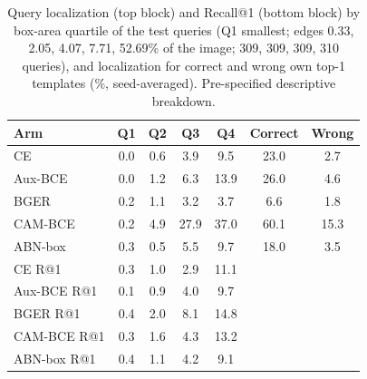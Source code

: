 \begin{table}[t]
\centering\footnotesize\setlength{\tabcolsep}{3pt}
\caption{Query localization (top block) and Recall@1 (bottom block) by box-area quartile of the test queries (Q1 smallest; edges 0.33, 2.05, 4.07, 7.71, 52.69\% of the image; 309, 309, 309, 310 queries), and localization for correct and wrong own top-1 templates (\%, seed-averaged). Pre-specified descriptive breakdown.}
\label{tab:osld-size}
\begin{tabular}{lcccccc}
\toprule
Arm & Q1 & Q2 & Q3 & Q4 & Correct & Wrong\\
\midrule
CE & 0.0 & 0.6 & 3.9 & 9.5 & 23.0 & 2.7\\
Aux-BCE & 0.0 & 1.2 & 6.3 & 13.9 & 26.0 & 4.6\\
BGER & 0.2 & 1.1 & 3.2 & 3.7 & 6.6 & 1.8\\
CAM-BCE & 0.2 & 4.9 & 27.9 & 37.0 & 60.1 & 15.3\\
ABN-box & 0.3 & 0.5 & 5.5 & 9.7 & 18.0 & 3.5\\
\midrule
CE R@1 & 0.3 & 1.0 & 2.9 & 11.1 & & \\
Aux-BCE R@1 & 0.1 & 0.9 & 4.0 & 9.7 & & \\
BGER R@1 & 0.4 & 2.0 & 8.1 & 14.8 & & \\
CAM-BCE R@1 & 0.3 & 1.6 & 4.3 & 13.2 & & \\
ABN-box R@1 & 0.4 & 1.1 & 4.2 & 9.1 & & \\
\bottomrule
\end{tabular}
\end{table}
